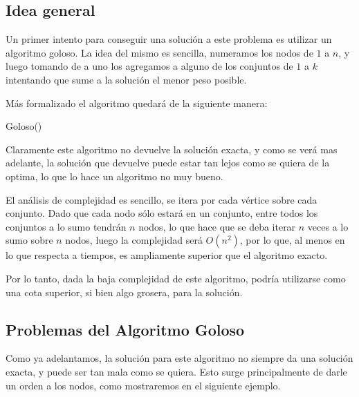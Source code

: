\subsection{Idea general}

Un primer intento para conseguir una solución a este problema es utilizar un algoritmo goloso. La idea del mismo es sencilla, numeramos los nodos de $1$ a $n$, y luego tomando de a uno los agregamos a alguno de los conjuntos de $1$ a $k$ intentando que sume a la solución el menor peso posible.

Más formalizado el algoritmo quedará de la siguiente manera:


\begin{algorithm}
  \begin{algorithmic}[1]\parskip=1mm
 \caption{ Goloso()}
  \end{algorithmic}
  \end{algorithm}

Claramente este algoritmo no devuelve la solución exacta, y como se verá mas adelante, la solución que devuelve puede estar tan lejos como se quiera de la optima, lo que lo hace un algoritmo no muy bueno.

El análisis de complejidad es sencillo, se itera por cada vértice sobre cada conjunto. Dado que cada nodo sólo estará en un conjunto, entre todos los conjuntos a lo sumo tendrán $n$ nodos, lo que hace que se deba iterar $n$ veces a lo sumo sobre $n$ nodos, luego la complejidad será $O(n^2)$, por lo que, al menos en lo que respecta a tiempos, es ampliamente superior que el algoritmo exacto.

Por lo tanto, dada la baja complejidad de este algoritmo, podría utilizarse como una cota superior, si bien algo grosera, para la solución.

\subsection{Problemas del Algoritmo Goloso}

Como ya adelantamos, la solución para este algoritmo no siempre da una solución exacta, y puede ser tan mala como se quiera. Esto surge principalmente de darle un orden a los nodos, como mostraremos en el siguiente ejemplo.

